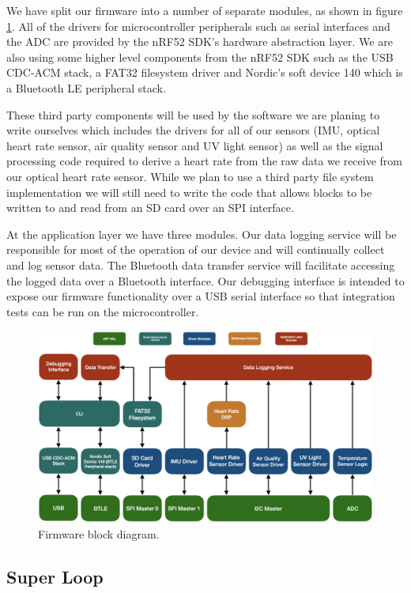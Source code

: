 We have split our firmware into a number of separate modules, as shown in figure
\ref{fig:fw_block_diag}. All of the drivers for microcontroller peripherals
such as serial interfaces and the ADC are provided by the nRF52 SDK's hardware
abstraction layer. We are also using some higher level components from the
nRF52 SDK such as the USB CDC-ACM stack, a FAT32 filesystem driver and Nordic's
soft device 140 which is a Bluetooth LE peripheral stack.

These third party components will be used by the software we are planing to
write ourselves which includes the drivers for all of our sensors (IMU, optical
heart rate sensor, air quality sensor and UV light sensor) as well as the signal
processing code required to derive a heart rate from the raw data we receive
from our optical heart rate sensor. While we plan to use a third party file
system implementation we will still need to write the code that allows blocks
to be written to and read from an SD card over an SPI interface.

At the application layer we have three modules. Our data logging service will be
responsible for most of the operation of our device and will continually collect
and log sensor data. The Bluetooth data transfer service will facilitate
accessing the logged data over a Bluetooth interface. Our debugging interface is
intended to expose our firmware functionality over a USB serial interface so
that integration tests can be run on the microcontroller.

\begin{figure}[!htb]
\centering
\includegraphics[width=\textwidth]{images/fw_block_diag.png}
\caption{Firmware block diagram.}
\label{fig:fw_block_diag}
\end{figure}

\subsection{Super Loop}

